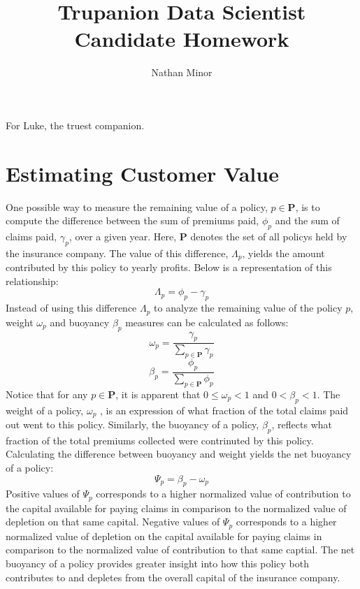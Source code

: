 \documentclass[12pt,letterpaper,titlepage]{article}
\author{Nathan Minor}
\title{Trupanion Data Scientist Candidate Homework}
\begin{document}
	\maketitle
 
		\begin{center}
			For Luke, the truest companion.
		\end{center}
		\newpage	
	
	\tableofcontents
	
	\newpage
	\section{Estimating Customer Value}
		
		One possible way to measure the remaining value of a policy, $p \in \mathbf{P}$, is to compute the difference between the sum of premiums paid, $\phi_p$ and the sum of claims paid, $\gamma_p$, over a given year. Here, $\mathbf{P}$ denotes the set of all policys held by the insurance company. The value of this difference, $\Lambda_p$, yields  the amount contributed by this policy to yearly profits. Below is a representation of this relationship:
		\begin{equation} \label{eq:Lambda_p}
			\Lambda_p = \phi_p - \gamma_p
		\end{equation}
		Instead of using this difference $\Lambda_p$ to analyze the remaining value of the policy $p$, weight $\omega_p$ and buoyancy $\beta_p$ measures can be calculated as follows:
		\begin{equation} \label{eq:omega_p}
			\omega_p = \frac{\gamma_p}{\sum\limits_{p \in \mathbf{P}}{\gamma_p}}
		\end{equation}
		\begin{equation} \label{eq:beta_p}
			\beta_p = \frac{\phi_p}{\sum\limits_{p \in \mathbf{P}}{\phi_p}}
		\end{equation}		
		Notice that for any $p \in \mathbf{P}$, it is apparent that $0 \leq \omega_p < 1$ and $0 < \beta_p < 1$. The weight of a policy, $\omega_p$ , is an expression of what fraction of the total claims paid out went to this policy. Similarly, the buoyancy of a policy, $\beta_p$, reflects what fraction of the total premiums collected were contrinuted by this policy. Calculating the difference between buoyancy and weight yields the net buoyancy of a policy:
		\begin{equation} \label{eq:Psi_p}
			\Psi_p = \beta_p - \omega_p
		\end{equation}		
		Positive values of $\Psi_p$ corresponds to a higher normalized value of contribution to the capital available for paying claims in comparison to the normalized value of depletion on that same capital. Negative values of $\Psi_p$ corresponds to a higher normalized value of depletion on the capital available for paying claims in comparison to the normalized value of contribution to that same captial. The net buoyancy of a policy provides greater insight into how this policy both contributes to and depletes from the overall capital of the insurance company.
		
\end{document}
